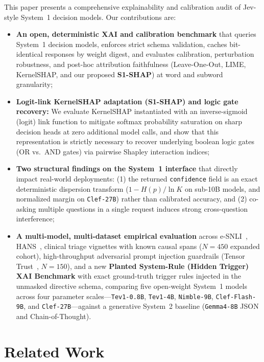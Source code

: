 \documentclass[10pt]{article}
\begin{document}
This paper presents a comprehensive explainability and calibration audit of Jev-style System~1 decision models.
Our contributions are:
\begin{itemize}
\item \textbf{An open, deterministic XAI and calibration benchmark} that queries System~1 decision models, enforces strict schema validation, caches bit-identical responses by weight digest, and evaluates calibration, perturbation robustness, and post-hoc attribution faithfulness (Leave-One-Out, LIME, KernelSHAP, and our proposed \textbf{S1-SHAP}) at word and subword granularity;
\item \textbf{Logit-link KernelSHAP adaptation (\textbf{S1-SHAP}) and logic gate recovery:} We evaluate KernelSHAP instantiated with an inverse-sigmoid (logit) link function to mitigate softmax probability saturation on sharp decision heads at zero additional model calls, and show that this representation is strictly necessary to recover underlying boolean logic gates (OR vs.\ AND gates) via pairwise Shapley interaction indices;
\item \textbf{Two structural findings on the System~1 interface} that directly impact real-world deployments: (1) the returned \texttt{confidence} field is an exact deterministic dispersion transform ($1 - H(p)/\ln K$ on sub-10B models, and normalized margin on \texttt{Clef-27B}) rather than calibrated accuracy, and (2) co-asking multiple questions in a single request induces strong cross-question interference;
\item \textbf{A multi-model, multi-dataset empirical evaluation} across e-SNLI~\cite{camburu2018}, HANS~\cite{mccoy2019}, clinical triage vignettes with known causal spans ($N=450$ expanded cohort), high-throughput adversarial prompt injection guardrails (Tensor Trust~\cite{toyer2023tensortrust}, $N=150$), and a new \textbf{Planted System-Rule (Hidden Trigger) XAI Benchmark} with exact ground-truth trigger rules injected in the unmasked directive schema, comparing five open-weight System~1 models across four parameter scales---\texttt{Tev1-0.8B}, \texttt{Tev1-4B}, \texttt{Nimble-9B}, \texttt{Clef-Flash-9B}, and \texttt{Clef-27B}---against a generative System~2 baseline (\texttt{Gemma4-8B} JSON and Chain-of-Thought).
\end{itemize}

\section{Related Work}
\end{document}
